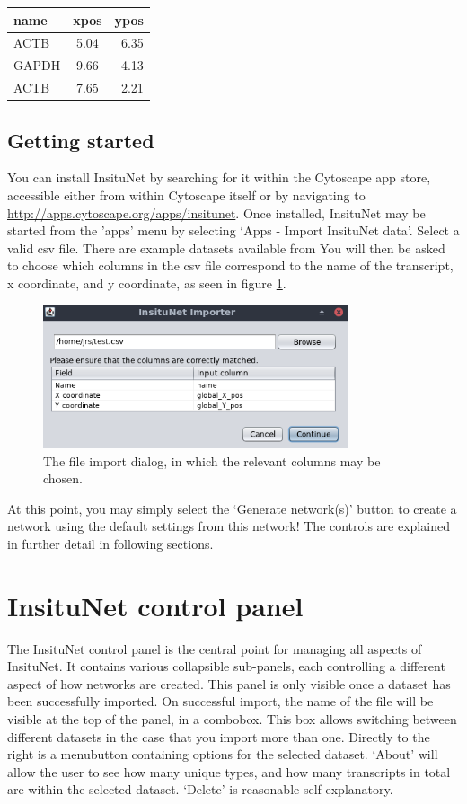 \documentclass[a4paper,12pt]{article}
\begin{document}
\begin{center}
\begin{tabular}{ l c r }
	\centering
	name & xpos & ypos \\ \hline
	ACTB & 5.04 & 6.35 \\
	GAPDH & 9.66 & 4.13 \\
	ACTB & 7.65 & 2.21 \\
\end{tabular}
\end{center}

\subsection{Getting started}
You can install InsituNet by searching for it within the Cytoscape app store, accessible either from within Cytoscape itself or by navigating to  \url{http://apps.cytoscape.org/apps/insitunet}. Once installed, InsituNet may be started from the 'apps' menu by selecting `Apps - Import InsituNet data'. Select a valid csv file. There are example datasets available from You will then be asked to choose which columns in the csv file correspond to the name of the transcript, x coordinate, and y coordinate, as seen in figure \ref{fig:sel}.
\begin{figure}[htb]
 	\caption{The file import dialog, in which the relevant columns may be chosen.}\label{fig:sel}
 	\centering
 	\includegraphics[width=0.8\textwidth]{sel}
\end{figure}
At this point, you may simply select the `Generate network(s)' button to create a network using the default settings from this network! The controls are explained in further detail in following sections.


\section{InsituNet control panel}

The InsituNet control panel is the central point for managing all aspects of InsituNet. It contains various collapsible sub-panels, each controlling a different aspect of how networks are created. This panel is only visible once a dataset has been successfully imported. On successful import, the name of the file will be visible at the top of the panel, in a combobox. This box allows switching between different datasets in the case that you import more than one. Directly to the right is a menubutton containing options for the selected dataset. `About' will allow the user to see how many unique types, and how many transcripts in total are within the selected dataset. `Delete' is reasonable self-explanatory.
\end{document}
